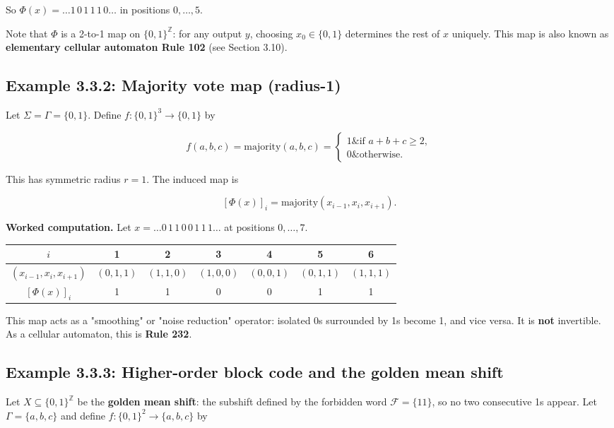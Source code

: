 So $\Phi(x) = \ldots 1\, 0\, 1\, 1\, 1\, 0 \ldots$ in positions $0, \ldots, 5$.

Note that $\Phi$ is a 2-to-1 map on $\{ 0,1\} ^\mathbb{Z}$: for any output $y$, choosing $x_0 \in \{ 0,1\} $ determines the rest of $x$ uniquely. This map is also known as \textbf{elementary cellular automaton Rule 102} (see Section 3.10).

\subsection{Example 3.3.2: Majority vote map (radius-1)}

Let $\Sigma = \Gamma = \{ 0, 1\} $. Define $f: \{ 0,1\} ^3 \to \{ 0,1\} $ by

\[f(a, b, c) = \text{majority}(a, b, c) = \begin{cases} 1 \& \text{if } a + b + c \geq 2, \\ 0 \& \text{otherwise.} \end{cases}\]

This has symmetric radius $r = 1$. The induced map is

\[[\Phi(x)]_i = \text{majority}(x_{i-1}, x_i, x_{i+1}).\]

\textbf{Worked computation.} Let $x = \ldots 0\, 1\, 1\, 0\, 0\, 1\, 1\, 1 \ldots$ at positions $0, \ldots, 7$.

\begin{center}
\begin{tabular}{ccccccc}
\toprule
$i$ & 1 & 2 & 3 & 4 & 5 & 6 \\
\midrule
$(x_{i-1}, x_i, x_{i+1})$ & $(0,1,1)$ & $(1,1,0)$ & $(1,0,0)$ & $(0,0,1)$ & $(0,1,1)$ & $(1,1,1)$ \\
$[\Phi(x)]_i$ & 1 & 1 & 0 & 0 & 1 & 1 \\
\bottomrule
\end{tabular}
\end{center}

This map acts as a "smoothing" or "noise reduction" operator: isolated 0s surrounded by 1s become 1, and vice versa. It is \textbf{not} invertible. As a cellular automaton, this is \textbf{Rule 232}.

\subsection{Example 3.3.3: Higher-order block code and the golden mean shift}

Let $X \subseteq \{ 0,1\} ^\mathbb{Z}$ be the \textbf{golden mean shift}: the subshift defined by the forbidden word $\mathcal{F} = \{ 11\} $, so no two consecutive 1s appear. Let $\Gamma = \{ a, b, c\} $ and define $f: \{ 0,1\} ^2 \to \{ a, b, c\} $ by

